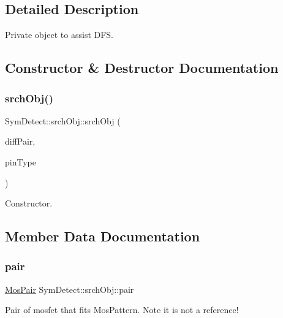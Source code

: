 \subsection{Detailed Description}
Private object to assist D\+FS. 

\subsection{Constructor \& Destructor Documentation}
\mbox{\label{structSymDetect_1_1srchObj_a12d3ae03e9163b5e7bc46a224022880e}} 
\subsubsection{\texorpdfstring{srch\+Obj()}{srchObj()}}
{\footnotesize\ttfamily Sym\+Detect\+::srch\+Obj\+::srch\+Obj (\begin{DoxyParamCaption}\item[{\hyperlink{structMosPair}{Mos\+Pair} \&}]{diff\+Pair,  }\item[{\hyperlink{type_8h_afaab50027002ecbb6c8ac27e727d1bb4}{Pin\+Type}}]{pin\+Type }\end{DoxyParamCaption})\hspace{0.3cm}{\ttfamily [inline]}}



Constructor. 



\subsection{Member Data Documentation}
\mbox{\label{structSymDetect_1_1srchObj_aec9a5afaae2c8dfdf79ff4c654c73ede}} 
\subsubsection{\texorpdfstring{pair}{pair}}
{\footnotesize\ttfamily \hyperlink{structMosPair}{Mos\+Pair} Sym\+Detect\+::srch\+Obj\+::pair}

Pair of mosfet that fits Mos\+Pattern. Note it is not a reference! \mbox{\label{structSymDetect_1_1srchObj_ae7cd64a55ef6fa4dae853e0ff822888a}} 
